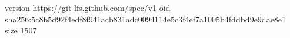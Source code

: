 version https://git-lfs.github.com/spec/v1
oid sha256:5c8b5d92f4edf8f941acb831adc0094114e5c3f4ef7a1005b4fddbd9e9dae8e1
size 1507
